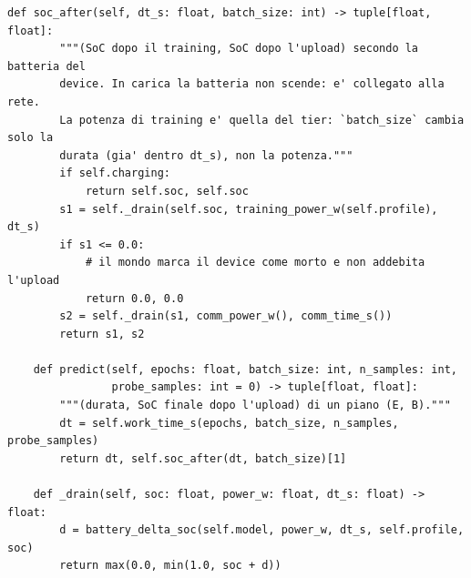 \documentclass[11pt,a4paper]{article}
\begin{document}
\begin{lstlisting}[style=py,firstnumber=41,caption={\texttt{tesifl/device/fuel\_gauge.py}, lines 41--130}]
    def soc_after(self, dt_s: float, batch_size: int) -> tuple[float, float]:
        """(SoC dopo il training, SoC dopo l'upload) secondo la batteria del
        device. In carica la batteria non scende: e' collegato alla rete.
        La potenza di training e' quella del tier: `batch_size` cambia solo la
        durata (gia' dentro dt_s), non la potenza."""
        if self.charging:
            return self.soc, self.soc
        s1 = self._drain(self.soc, training_power_w(self.profile), dt_s)
        if s1 <= 0.0:
            # il mondo marca il device come morto e non addebita l'upload
            return 0.0, 0.0
        s2 = self._drain(s1, comm_power_w(), comm_time_s())
        return s1, s2

    def predict(self, epochs: float, batch_size: int, n_samples: int,
                probe_samples: int = 0) -> tuple[float, float]:
        """(durata, SoC finale dopo l'upload) di un piano (E, B)."""
        dt = self.work_time_s(epochs, batch_size, n_samples, probe_samples)
        return dt, self.soc_after(dt, batch_size)[1]

    def _drain(self, soc: float, power_w: float, dt_s: float) -> float:
        d = battery_delta_soc(self.model, power_w, dt_s, self.profile, soc)
        return max(0.0, min(1.0, soc + d))
\end{lstlisting}
\end{document}
